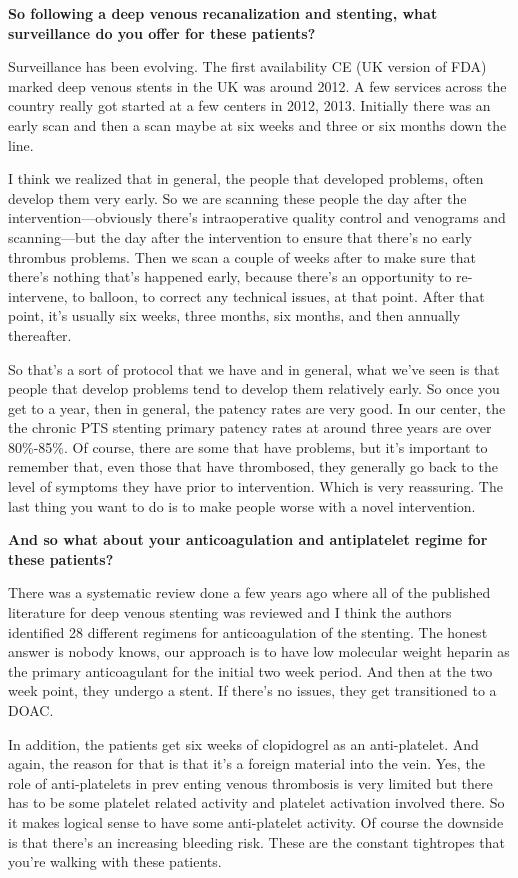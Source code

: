 \documentclass[
]{book}
\begin{document}
\textbf{So following a deep venous recanalization and stenting, what
surveillance do you offer for these patients?}

Surveillance has been evolving. The first availability CE (UK version of
FDA) marked deep venous stents in the UK was around 2012. A few services
across the country really got started at a few centers in 2012, 2013.
Initially there was an early scan and then a scan maybe at six weeks and
three or six months down the line.

I think we realized that in general, the people that developed problems,
often develop them very early. So we are scanning these people the day
after the intervention---obviously there's intraoperative quality
control and venograms and scanning---but the day after the intervention
to ensure that there's no early thrombus problems. Then we scan a couple
of weeks after to make sure that there's nothing that's happened early,
because there's an opportunity to re-intervene, to balloon, to correct
any technical issues, at that point. After that point, it's usually six
weeks, three months, six months, and then annually thereafter.

So that's a sort of protocol that we have and in general, what we've
seen is that people that develop problems tend to develop them
relatively early. So once you get to a year, then in general, the
patency rates are very good. In our center, the the chronic PTS stenting
primary patency rates at around three years are over 80\%-85\%. Of course,
there are some that have problems, but it's important to remember that,
even those that have thrombosed, they generally go back to the level of
symptoms they have prior to intervention. Which is very reassuring. The
last thing you want to do is to make people worse with a novel
intervention.

\textbf{And so what about your anticoagulation and antiplatelet regime for
these patients?}

There was a systematic review done a few years ago where all of the
published literature for deep venous stenting was reviewed and I think
the authors identified 28 different regimens for anticoagulation of the
stenting.\citep{notten2021} The honest answer is nobody knows, our approach
is to have low molecular weight heparin as the primary anticoagulant for
the initial two week period. And then at the two week point, they
undergo a stent. If there's no issues, they get transitioned to a DOAC.

In addition, the patients get six weeks of clopidogrel as an
anti-platelet. And again, the reason for that is that it's a foreign
material into the vein. Yes, the role of anti-platelets in prev enting
venous thrombosis is very limited but there has to be some platelet
related activity and platelet activation involved there. So it makes
logical sense to have some anti-platelet activity. Of course the
downside is that there's an increasing bleeding risk. These are the
constant tightropes that you're walking with these patients.
\end{document}
